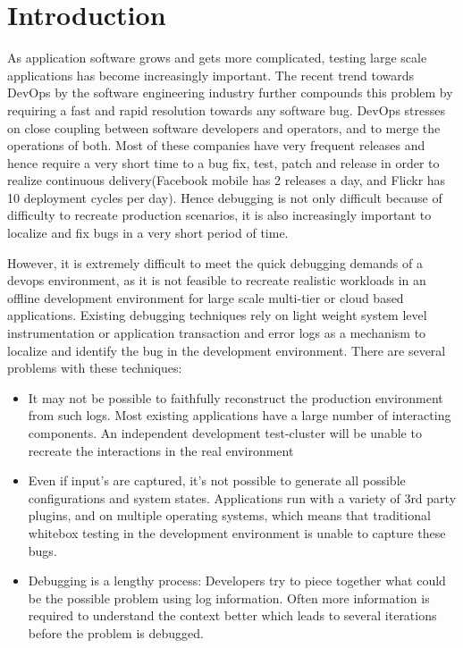\section{Introduction}
\label{sec:intro}

As application software grows and gets more complicated, testing large scale applications has become increasingly important. 
The recent trend towards DevOps\cite{devops} by the software engineering industry further compounds this problem by requiring a fast and rapid resolution towards any software bug.
DevOps stresses on close coupling between software developers and operators, and to merge the operations of both. 
Most of these companies have very frequent releases and hence require a very short time to a bug fix, test, patch and release in order to realize continuous delivery(Facebook mobile has 2 releases a day, and Flickr has 10 deployment cycles per day).
Hence debugging is not only difficult because of difficulty to recreate production scenarios, it is also increasingly important to localize and fix bugs in a very short period of time.

However, it is extremely difficult to meet the quick debugging demands of a devops environment, as it is not feasible to recreate realistic workloads in an offline development environment for large scale multi-tier or cloud based applications.
Existing debugging techniques\cite{clue,magpie,vPath} rely on light weight system level instrumentation or application transaction and error logs as a mechanism to localize and identify the bug in the development environment.
There are several problems with these techniques:
\begin{itemize}[leftmargin=*]
\item It may not be possible to faithfully reconstruct the production environment from such logs. 
Most existing applications have a large number of interacting components. 
An independent development test-cluster will be unable to recreate the interactions in the real environment 
\item Even if input's are captured, it's not possible to generate all possible configurations and system states. 
Applications run with a variety of 3rd party plugins, and on multiple operating systems, which means that traditional whitebox testing in the development environment is unable to capture these bugs.
\item Debugging is a lengthy process: Developers try to piece together what could be the possible problem using log information.
Often more information is required to understand the context better which leads to several iterations before the problem is debugged.
\end{itemize}

